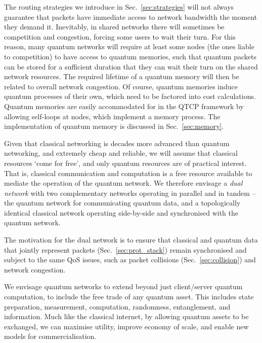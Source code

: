 \documentclass[aps, rmp, twocolumn, amsmath, amssymb, nofootinbib, superscriptaddress, longbibliography, floatfix, table-of-contents, eqsecnum]{revtex4-1}
\begin{document}
The routing strategies we introduce in Sec.~\ref{sec:strategies} will not always guarantee that packets have immediate access to network bandwidth the moment they demand it. Inevitably, in shared networks there will sometimes be competition and congestion, forcing some users to wait their turn. For this reason, many quantum networks will require at least some nodes (the ones liable to competition) to have access to quantum memories, such that quantum packets can be stored for a sufficient duration that they can wait their turn on the shared network resources. The required lifetime of a quantum memory will then be related to overall network congestion. Of course, quantum memories induce quantum processes of their own, which need to be factored into cost calculations. Quantum memories are easily accommodated for in the QTCP framework by allowing self-loops at nodes, which implement a memory process. The implementation of quantum memory is discussed in Sec.~\ref{sec:memory}.

Given that classical networking is decades more advanced than quantum networking, and extremely cheap and reliable, we will assume that classical resources `come for free', and only quantum resources are of practical interest. That is, classical communication and computation is a free resource available to mediate the operation of the quantum network. We therefore envisage a \textit{dual network} with two complementary networks operating in parallel and in tandem -- the quantum network for communicating quantum data, and a topologically identical classical network operating side-by-side and synchronised with the quantum network.

The motivation for the dual network is to ensure that classical and quantum data that jointly represent packets (Sec.~\ref{sec:prot_stack}) remain synchronised and subject to the same QoS issues, such as packet collisions (Sec.~\ref{sec:collision}) and network congestion.

We envisage quantum networks to extend beyond just client/server quantum computation, to include the free trade of any quantum asset. This includes state preparation, measurement, computation, randomness, entanglement, and information. Much like the classical internet, by allowing quantum assets to be exchanged, we can maximise utility, improve economy of scale, and enable new models for commercialisation.
\end{document}
